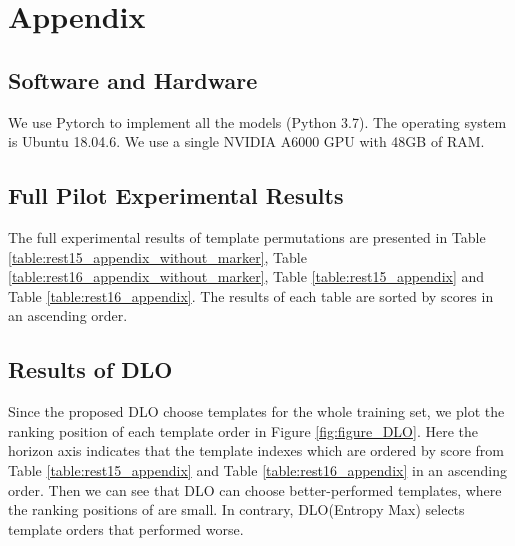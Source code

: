 \documentclass[11pt]{article}
\begin{document}
\section{Appendix}
\subsection{Software and Hardware}
We use Pytorch to implement all the models (Python 3.7). The operating system is Ubuntu 18.04.6. We use a single NVIDIA A6000 GPU with 48GB of RAM.






\subsection{Full Pilot Experimental Results}
The full experimental results of template permutations are presented in Table \ref{table:rest15_appendix_without_marker}, Table \ref{table:rest16_appendix_without_marker}, Table \ref{table:rest15_appendix} and Table \ref{table:rest16_appendix}. The results of each table are sorted by  scores in an ascending order.



\subsection{Results of DLO}
Since the proposed DLO choose templates for the whole training set, we plot the ranking position of each template order in Figure \ref{fig:figure_DLO}. Here the horizon axis indicates that the template indexes which are ordered by  score from Table \ref{table:rest15_appendix} and Table \ref{table:rest16_appendix} in an ascending order. Then we can see that DLO can choose better-performed templates, where the ranking positions of  are small. In contrary, DLO(Entropy Max) selects template orders that performed worse. 
\end{document}
